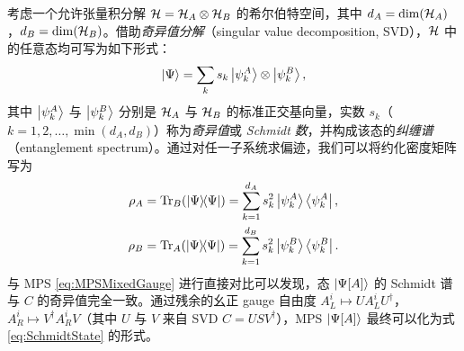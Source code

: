 考虑一个允许张量积分解 $\mathcal H=\mathcal H_A\otimes \mathcal H_B$ 的希尔伯特空间，其中 $d_A=\dim(\mathcal H_A)$，$d_B=\dim(\mathcal H_B)$。借助\emph{奇异值分解}（singular value decomposition, SVD），$\mathcal H$ 中的任意态均可写为如下形式：
\begin{equation}\label{eq:SchmidtState}
    \ket{\Psi} = \sum_k s_k \ket{\psi_k^A}\otimes\ket{\psi_k^B},
\end{equation}
其中 $\ket{\psi_k^A}$ 与 $\ket{\psi_k^B}$ 分别是 $\mathcal H_A$ 与 $\mathcal H_B$ 的标准正交基向量，实数 $s_k$（$k=1,2,\dots,\min(d_A,d_B)$）称为\emph{奇异值}或 \emph{Schmidt 数}，并构成该态的\emph{纠缠谱}（entanglement spectrum）。通过对任一子系统求偏迹，我们可以将约化密度矩阵写为
\begin{align}
    \rho_A &= {\rm Tr}_B(\ketbra{\Psi}) = \sum_{k=1}^{d_A} s_k^2 \ket{\psi_k^A}\bra{\psi_k^A}, \\
    \rho_B &= {\rm Tr}_A(\ketbra{\Psi}) = \sum_{k=1}^{d_B} s_k^2 \ket{\psi_k^B}\bra{\psi_k^B}.
\end{align}
与 MPS \eqref{eq:MPSMixedGauge} 进行直接对比可以发现，态 $\ket{\Psi[A]}$ 的 Schmidt 谱与 $C$ 的奇异值完全一致。通过残余的幺正 gauge 自由度 $A_L^i\mapsto UA_L^iU^\dagger $，$A_R^i\mapsto V^\dagger A_R^iV$（其中 $U$ 与 $V$ 来自 SVD $C=USV^\dagger$），MPS $\ket{\Psi[A]}$ 最终可以化为式 \eqref{eq:SchmidtState} 的形式。

